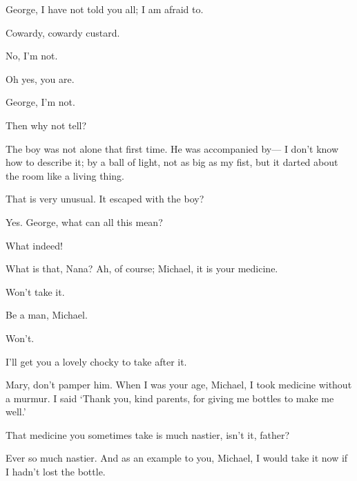 \begin{drama}
George, I have not told you all; I am afraid to.

Cowardy, cowardy custard.

No, I’m not.

\mrdarlingspeaks
Oh yes, you are.

\mrsdarlingspeaks
George, I’m not.

\mrdarlingspeaks
Then why not tell?

\mrsdarlingspeaks
The boy was not alone that first time.
He was accompanied by—%
I don’t know how to describe it;
by a ball of light, not as big as my fist, but it darted about the room like a living thing.

That is very unusual.
It escaped with the boy?

\mrsdarlingspeaks
Yes.
George, what can all this mean?

What indeed!


What is that, Nana?
Ah, of course; Michael, it is your medicine.

Won’t take it.

Be a man, Michael.

\michaelspeaks
Won’t.

I’ll get you a lovely chocky to take after it.

\mrdarlingspeaks
Mary, don’t pamper him.
When I was your age, Michael, I took medicine without a murmur.
I said ‘Thank you, kind parents, for giving me bottles to make me well.’


\wendyspeaks
That medicine you sometimes take is much nastier, isn’t it, father?

Ever so much nastier.
And as an example to you, Michael, I would take it now
if I hadn’t lost the bottle.


\end{drama}

